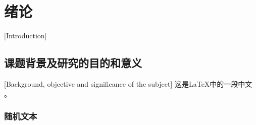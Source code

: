 
\chapter{绪论}[Introduction]
\section{课题背景及研究的目的和意义}[Background, objective and significance of the subject]
这是\LaTeX 中的一段中文\cite{man} 。

\subsection{随机文本}
\lipsum[1]

\nocite{*}

